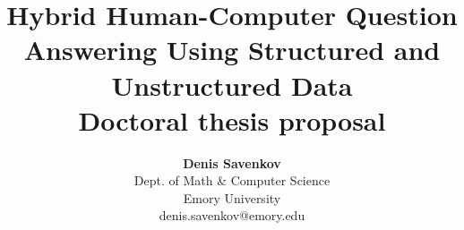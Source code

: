 \documentclass[12pt]{report}
\begin{document}
% 

\setlength{\headsep}{0.15in}
\setlength{\topmargin}{-.5in}
\pagestyle{empty}



\title{
\textbf{Hybrid Human-Computer Question Answering Using Structured and Unstructured Data} \\
\normalfont Doctoral thesis proposal}
\author{\textbf{Denis Savenkov}\\
      Dept. of Math \& Computer Science\\
      Emory University\\
      denis.savenkov@emory.edu
}


\mydate

\maketitle
\end{document}
